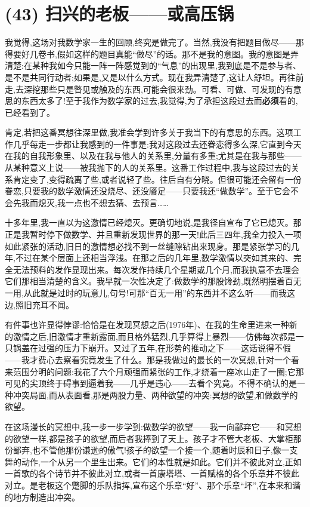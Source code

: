 \section{(43) 扫兴的老板——或高压锅}

 \noindent\pmark 我觉得,这场对我数学家一生的回顾,终究是做完了。当然,我没有把题目做尽——那得要好几卷书,假如这样的题目真能“做尽”的话。那不是我的意图。我的意图是弄清楚:在某种我如今只能一阵一阵感觉到的“气息”的出现里,我到底是不是参与者、是不是共同行动者;如果是,又是以什么方式。现在我弄清楚了,这让人舒坦。再往前走,去深挖那些只是瞥见或触及的东西,可能会很来劲。可看、可做、可发现的有意思的东西太多了!至于我作为数学家的过去,我觉得,为了承担这段过去而\textbf{必须}看的,已经看到了。

肯定,若把这番冥想往深里做,我准会学到许多关于我当下的有意思的东西。这项工作几乎每走一步都让我感到的一件事是:我对这段过去还眷恋得多么深,它直到今天在我的自我形象里、以及在我与他人的关系里,分量有多重;尤其是在我与那些——从某种意义上说——被我抛下的人的关系里。这番工作过程中,我与这段过去的关系肯定变了,变得疏离了些,或者说轻了些。往后自有分晓。但很可能还会留有一份眷恋,只要我的数学激情还没烧尽、还没餍足——只要我还“做数学”。至于它会不会先我而熄灭,我一点也不想去猜、去预言……

十多年里,我一直以为这激情已经熄灭。更确切地说,是我径自宣布了它已熄灭。那正是我暂时停下做数学、并且重新发现世界的那一天!此后三四年,我全力投入一项如此紧张的活动,旧日的激情想必找不到一丝缝隙钻出来现身。那是紧张学习的几年,不过在某个层面上还相当浮浅。在那之后的几年里,数学激情以突如其来的、完全无法预料的发作显现出来。每次发作持续几个星期或几个月,而我执意不去理会它们那相当清楚的含义。我早就一次性决定了:做数学的那股馋劲,既然明摆着百无一用,从此就是过时的玩意儿,句号!可那“百无一用”的东西并不这么听——而我这边,照旧充耳不闻。

 \noindent\pmark 有件事也许显得悖谬:恰恰是在发现冥想之后(1976年)、在我的生命里进来一种新的激情之后,旧激情才重新露面,而且格外猛烈,几乎算得上暴烈——仿佛每次都是一只锅盖在过强的压力下崩开。又过了五年,在形势的推动之下——这话说得不假——我才费心去察看究竟发生了什么。那是我做过的最长的一次冥想,针对一个看来范围分明的问题:我花了六个月顽强而紧张的工作,才绕着一座冰山走了一圈;它那可见的尖顶终于碍事到逼着我——几乎是违心——去看个究竟。不得不确认的是一种冲突局面,而从表面看,那是两股力量、两种欲望的冲突:冥想的欲望,和做数学的欲望。

在这场漫长的冥想中,我一步一步学到:做数学的欲望——我一向鄙弃它——和冥想的欲望一样,都是孩子的欲望,而后者我捧到了天上。孩子才不管大老板、大掌柜那份鄙弃,也不管他那份谦逊的傲气!孩子的欲望一个接一个,随着时辰和日子,像一支舞的动作,一个从另一个里生出来。它们的本性就是如此。它们并不彼此对立,正如一首歌的各个诗节并不彼此对立,或者一首康塔塔、一首赋格的各个乐章并不彼此对立。是老板这个蹩脚的乐队指挥,宣布这个乐章“好”、那个乐章“坏”,在本来和谐的地方制造出冲突。

